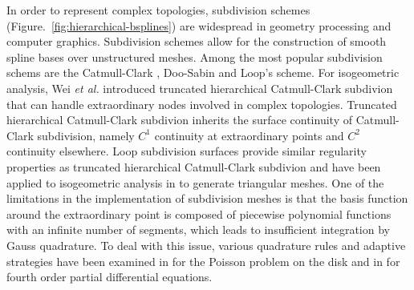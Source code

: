  In order to represent complex topologies, subdivision schemes (Figure.~\ref{fig:hierarchical-bsplines}) are widespread in geometry processing and computer graphics. Subdivision schemes allow for the construction of smooth spline bases over unstructured meshes. Among the most popular subdivision schems are the Catmull-Clark \cite{catmull_recursively_1978}, Doo-Sabin \cite{doo_behaviour_1978} and Loop's \cite{loop_smooth_1987} scheme. For isogeometric analysis, Wei \textit{et al.} \cite{wei_truncated_2015} introduced truncated hierarchical Catmull-Clark subdivion that can handle extraordinary nodes involved in complex topologies. Truncated hierarchical Catmull-Clark subdivion inherits the surface continuity of Catmull-Clark subdivision, namely $C^1$ continuity at extraordinary points and $C^2$ continuity elsewhere. Loop subdivision surfaces provide similar regularity properties as truncated hierarchical Catmull-Clark subdivion and have been applied to isogeometric analysis in \cite{kang_truncated_2016,pan_isogeometric_2015} to generate triangular meshes. One of the limitations in the implementation of subdivision meshes is that the basis function around the extraordinary point is composed of piecewise polynomial functions with an infinite number of segments, which leads to insufficient integration by Gauss quadrature. To deal with this issue, various quadrature rules and adaptive strategies have been examined in \cite{nguyen_comparative_2014} for the Poisson problem on the disk and in \cite{juttler_numerical_2016} for fourth order partial differential equations. \par

